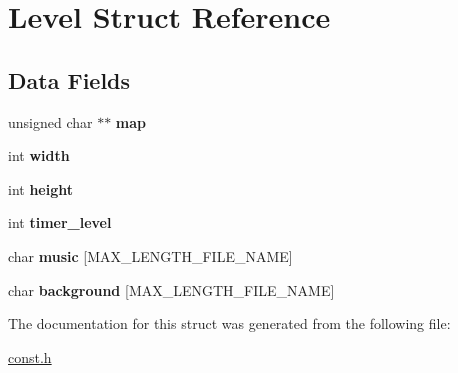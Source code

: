 \hypertarget{struct_level}{\section{Level Struct Reference}
\label{struct_level}
}
\subsection*{Data Fields}
\begin{DoxyCompactItemize}
\item 
\hypertarget{struct_level_a6d985f8729c187f1c35dabba2738f0bd}{unsigned char $\ast$$\ast$ {\bfseries map}}\label{struct_level_a6d985f8729c187f1c35dabba2738f0bd}

\item 
\hypertarget{struct_level_a2474a5474cbff19523a51eb1de01cda4}{int {\bfseries width}}\label{struct_level_a2474a5474cbff19523a51eb1de01cda4}

\item 
\hypertarget{struct_level_ad12fc34ce789bce6c8a05d8a17138534}{int {\bfseries height}}\label{struct_level_ad12fc34ce789bce6c8a05d8a17138534}

\item 
\hypertarget{struct_level_a28c59da9677a9d7b98db49328a77dc3c}{int {\bfseries timer\-\_\-level}}\label{struct_level_a28c59da9677a9d7b98db49328a77dc3c}

\item 
\hypertarget{struct_level_a36c7c7c6b9119bc9cdf5ec62ebf49554}{char {\bfseries music} \mbox{[}M\-A\-X\-\_\-\-L\-E\-N\-G\-T\-H\-\_\-\-F\-I\-L\-E\-\_\-\-N\-A\-M\-E\mbox{]}}\label{struct_level_a36c7c7c6b9119bc9cdf5ec62ebf49554}

\item 
\hypertarget{struct_level_ad8280c14050559fbd855943575019840}{char {\bfseries background} \mbox{[}M\-A\-X\-\_\-\-L\-E\-N\-G\-T\-H\-\_\-\-F\-I\-L\-E\-\_\-\-N\-A\-M\-E\mbox{]}}\label{struct_level_ad8280c14050559fbd855943575019840}

\end{DoxyCompactItemize}


The documentation for this struct was generated from the following file\-:\begin{DoxyCompactItemize}
\item 
\hyperlink{const_8h}{const.\-h}\end{DoxyCompactItemize}
